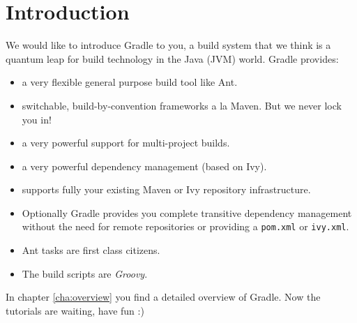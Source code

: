 \chapter{Introduction}
We would like to introduce Gradle to you, a build system that we think is a quantum leap for build technology in the Java (JVM) world. Gradle provides:
\begin{itemize}
	\item a very flexible general purpose build tool like Ant.
    \item switchable, build-by-convention frameworks a la Maven. But we never lock you in!
    \item a very powerful support for multi-project builds.
    \item a very powerful dependency management (based on Ivy). 
    \item supports fully your existing Maven or Ivy repository infrastructure.
	\item Optionally Gradle provides you complete transitive dependency management without the need for remote repositories or providing a \texttt{pom.xml} or \texttt{ivy.xml}.
    \item Ant tasks are first class citizens.
    \item The build scripts are \emph{Groovy}. 
\end{itemize}
In chapter \ref{cha:overview} you find a detailed overview of Gradle. Now the tutorials are waiting, have fun :)



    

